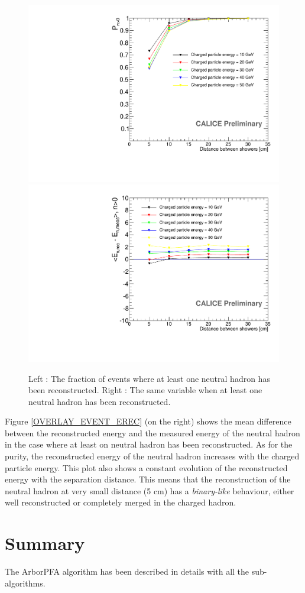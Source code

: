 \documentclass[cits]{JINST}
\begin{document}
\begin{figure}[!h]
  \begin{center}
    \includegraphics[width=0.47\linewidth]{plots/OverlayEvent_NeutralPercentage.pdf}
    \includegraphics[width=0.47\linewidth]{plots/OverlayEvent_NeutralEnergyDifferenceMeanNeutralEfficient.pdf}
  \end{center}
  \caption{\label{OVERLAY_EVENT_EREC} \label{OVERLAY_EVENT_NEUTRAL_PERCENTAGE} Left : The fraction of events where at least one neutral hadron has been reconstructed. Right : The same variable when at least one neutral hadron has been reconstructed.}
\end{figure}

Figure \ref{OVERLAY_EVENT_EREC} (on the right) shows the mean difference between the reconstructed energy and the measured energy of the neutral hadron in the case where at least on neutral hadron has been reconstructed. As for the purity, the reconstructed energy of the neutral hadron increases with the charged particle energy. This plot also shows a constant evolution of the reconstructed energy with the separation distance. This means that the reconstruction of the neutral hadron at very small distance (5 cm) has a \textit{binary-like} behaviour, either well reconstructed or completely merged in the charged hadron.

\newpage
\section{Summary}

The ArborPFA algorithm has been described in details with all the sub-algorithms. 
\end{document}
